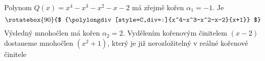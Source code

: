 \begin{mdframed}[style=mdexam]
  \begin{example}\label{MAI:exam135} 
    Polynom \(Q(x) = x^4-x^3-x^2-x-2\) má zřejmě kořen \(\alpha_1=-1\). Je 
    \begin{equation*}
      \rotatebox{90}{$
        {\polylongdiv[style=C,div=:]{x^4-x^3-x^2-x-2}{x+1}}
      $}
    \end{equation*}
    Výsledný mnohočlen má kořen \(\alpha_2=2\). Vydělením kořenovým činitelem \((x-2)\) dostaneme
    mnohočlen \((x^2+1)\), který je již nerozložitelný v reálné kořenové činitele
  \end{example}
\end{mdframed}